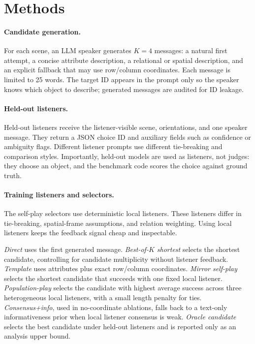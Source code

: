 \documentclass{article}
\begin{document}
\section{Methods}

\paragraph{Candidate generation.}
For each scene, an LLM speaker generates $K=4$ messages: a natural first attempt, a concise attribute description, a relational or spatial description, and an explicit fallback that may use row/column coordinates. Each message is limited to 25 words. The target ID appears in the prompt only so the speaker knows which object to describe; generated messages are audited for ID leakage.

\paragraph{Held-out listeners.}
Held-out listeners receive the listener-visible scene, orientations, and one speaker message. They return a JSON choice ID and auxiliary fields such as confidence or ambiguity flags. Different listener prompts use different tie-breaking and comparison styles. Importantly, held-out models are used as listeners, not judges: they choose an object, and the benchmark code scores the choice against ground truth.

\paragraph{Training listeners and selectors.}
The self-play selectors use deterministic local listeners. These listeners differ in tie-breaking, spatial-frame assumptions, and relation weighting. Using local listeners keeps the feedback signal cheap and inspectable.

\emph{Direct} uses the first generated message. \emph{Best-of-$K$ shortest} selects the shortest candidate, controlling for candidate multiplicity without listener feedback. \emph{Template} uses attributes plus exact row/column coordinates. \emph{Mirror self-play} selects the shortest candidate that succeeds with one fixed local listener. \emph{Population-play} selects the candidate with highest average success across three heterogeneous local listeners, with a small length penalty for ties. \emph{Consensus+info}, used in no-coordinate ablations, falls back to a text-only informativeness prior when local listener consensus is weak. \emph{Oracle candidate} selects the best candidate under held-out listeners and is reported only as an analysis upper bound.
\end{document}
